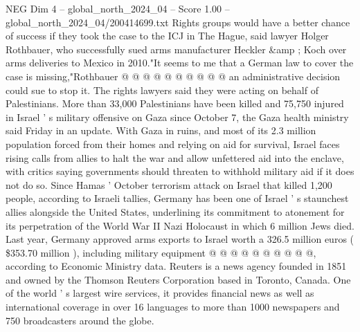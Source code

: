 \begin{textsample}{NEG Dim 4 – global\_north\_2024\_04 – Score 1.00 – global\_north\_2024\_04/200414699.txt}
Rights groups would have a better chance of success if they took the case to the ICJ in The Hague, said lawyer Holger Rothbauer, who successfully sued arms manufacturer Heckler \&amp ; Koch over arms deliveries to Mexico in 2010."It seems to me that a German law to cover the case is missing,"Rothbauer @ @ @ @ @ @ @ @ @ @ an administrative decision could sue to stop it.
The rights lawyers said they were acting on behalf of Palestinians.
More than 33,000 Palestinians have been killed and 75,750 injured in Israel ' s military offensive on Gaza since October 7, the Gaza health ministry said Friday in an update.
With Gaza in ruins, and most of its 2.3 million population forced from their homes and relying on aid for survival, Israel faces rising calls from allies to halt the war and allow unfettered aid into the enclave, with critics saying governments should threaten to withhold military aid if it does not do so.
Since Hamas ' October terrorism attack on Israel that killed 1,200 people, according to Israeli tallies, Germany has been one of Israel ' s staunchest allies alongside the United States, underlining its commitment to atonement for its perpetration of the World War II Nazi Holocaust in which 6 million Jews died.
Last year, Germany approved arms exports to Israel worth a 326.5 million euros ( \$353.70 million ), including military equipment @ @ @ @ @ @ @ @ @ @, according to Economic Ministry data.
Reuters is a news agency founded in 1851 and owned by the Thomson Reuters Corporation based in Toronto, Canada.
One of the world ' s largest wire services, it provides financial news as well as international coverage in over 16 languages to more than 1000 newspapers and 750 broadcasters around the globe.

\end{textsample}
